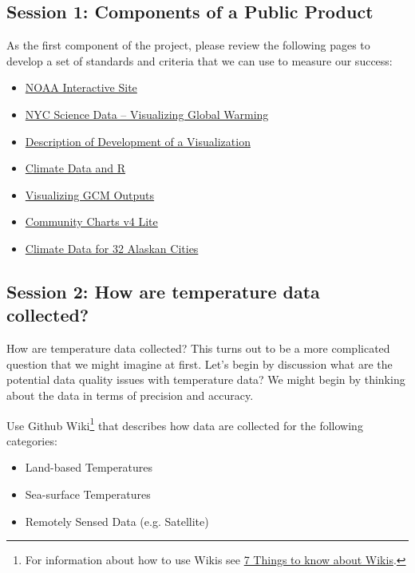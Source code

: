 \documentclass{article}\usepackage[]{graphicx}\usepackage[]{color}
\begin{document}
\subsection{Session 1: Components of a Public Product}

As the first component of the project, please review the following pages to develop a set of standards and criteria that we can use to measure our success:

\begin{itemize}
  \item \href{http://www.ncdc.noaa.gov/cag/}{NOAA Interactive Site}
  \item \href{http://blog.nycdatascience.com/student-works/visualizing-global-warming-through-shiny/}{NYC Science Data -- Visualizing Global Warming}
  \item \href{http://www.rpubs.com/dvbelyaev/GlobalWarming}{Description of Development of a Visualization}
  \item \href{http://www.r-bloggers.com/search/climate}{Climate Data and R}
  \item \href{https://uasnap.shinyapps.io/temp_wind_events/}{Visualizing GCM Outputs}
  \item \href{https://uasnap.shinyapps.io/cc4liteFinal/}{Community Charts v4 Lite}

  \item \href{https://uasnap.shinyapps.io/ak_station_cru_eda/}{Climate Data for 32 Alaskan Cities}
\end{itemize}  

\subsection{Session 2: How are temperature data collected?}

How are temperature data collected? This turns out to be a more complicated question that we might imagine at first. Let's begin by discussion what are the potential data quality issues with temperature data? We might begin by thinking about the data in terms of precision and accuracy.

Use Github Wiki\footnote{For information about how to use Wikis see \href{https://net.educause.edu/ir/library/pdf/ELI7004.pdf}{7 Things to know about Wikis}.} that describes how data are collected for the following categories:

\begin{itemize}
  \item Land-based Temperatures
  \item Sea-surface Temperatures
  \item Remotely Sensed Data (e.g. Satellite) 
\end{itemize}
\end{document}
